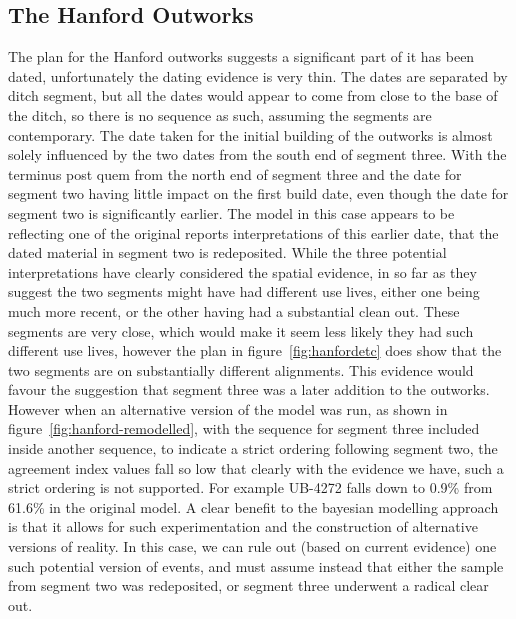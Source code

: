 \subsection{The Hanford Outworks}
The plan for the Hanford outworks suggests a significant part of it has been dated, unfortunately the dating evidence is very thin. The dates are separated by ditch segment, but all the dates would appear to come from close to the base of the ditch, so there is no sequence as such, assuming the segments are contemporary. The date taken for the initial building of the outworks is almost solely influenced by the two dates from the south end of segment three. With the terminus post quem from the north end of segment three and the date for segment two having little impact on the first build date, even though the date for segment two is significantly earlier. The model in this case appears to be reflecting one of the original reports interpretations of this earlier date, that the dated material in segment two is redeposited. While the three potential interpretations have clearly considered the spatial evidence, in so far as they suggest the two segments might have had different use lives, either one being much more recent, or the other having had a substantial clean out. These segments are very close, which would make it seem less likely they had such different use lives, however the plan in figure~\ref{fig:hanfordetc} does show that the two segments are on substantially different alignments. This evidence would favour the suggestion that segment three was a later addition to the outworks. However when an alternative version of the model was run, as shown in figure~\ref{fig:hanford-remodelled}, with the sequence for segment three included inside another sequence, to indicate a strict ordering following segment two, the agreement index values fall so low that clearly with the evidence we have, such a strict ordering is not supported. For example UB-4272 falls down to 0.9\% from 61.6\% in the original model. A clear benefit to the bayesian modelling approach is that it allows for such experimentation and the construction of alternative versions of reality. In this case, we can rule out (based on current evidence) one such potential version of events, and must assume instead that either the sample from segment two was redeposited, or segment three underwent a radical clear out.

